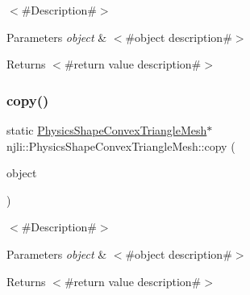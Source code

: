 $<$\#\+Description\#$>$


\begin{DoxyParams}{Parameters}
{\em object} & $<$\#object description\#$>$\\
\hline
\end{DoxyParams}
\begin{DoxyReturn}{Returns}
$<$\#return value description\#$>$ 
\end{DoxyReturn}
\mbox{\label{classnjli_1_1_physics_shape_convex_triangle_mesh_a843d37268a560c1512ee1cbb6405c46d}} 
\subsubsection{\texorpdfstring{copy()}{copy()}}
{\footnotesize\ttfamily static \mbox{\hyperlink{classnjli_1_1_physics_shape_convex_triangle_mesh}{Physics\+Shape\+Convex\+Triangle\+Mesh}}$\ast$ njli\+::\+Physics\+Shape\+Convex\+Triangle\+Mesh\+::copy (\begin{DoxyParamCaption}\item[{const \mbox{\hyperlink{classnjli_1_1_physics_shape_convex_triangle_mesh}{Physics\+Shape\+Convex\+Triangle\+Mesh}} \&}]{object }\end{DoxyParamCaption})\hspace{0.3cm}{\ttfamily [static]}}

$<$\#\+Description\#$>$


\begin{DoxyParams}{Parameters}
{\em object} & $<$\#object description\#$>$\\
\hline
\end{DoxyParams}
\begin{DoxyReturn}{Returns}
$<$\#return value description\#$>$ 
\end{DoxyReturn}
\mbox{\label{classnjli_1_1_physics_shape_convex_triangle_mesh_a5884ff06b5fba44d4c5f8575cddc0cd4}} 
